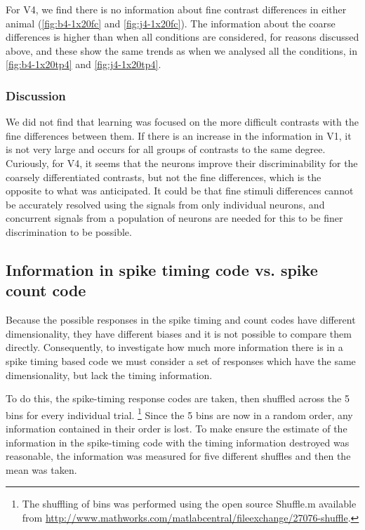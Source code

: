 For \ac{V4}, we find there is no information about fine contrast differences in either animal (\autoref{fig:b4-1x20fc} and \autoref{fig:j4-1x20fc}).
The information about the coarse differences is higher than when all conditions are considered, for reasons discussed above, and these show the same trends as when we analysed all the conditions, in \autoref{fig:b4-1x20tp4} and \autoref{fig:j4-1x20tp4}.


\subsubsection{Discussion}

We did not find that learning was focused on the more difficult contrasts with the fine differences between them.
If there is an increase in the information in \ac{V1}, it is not very large and occurs for all groups of contrasts to the same degree.
Curiously, for \ac{V4}, it seems that the neurons improve their discriminability for the coarsely differentiated contrasts, but not the fine differences, which is the opposite to what was anticipated.
It could be that fine stimuli differences cannot be accurately resolved using the signals from only individual neurons, and concurrent signals from a population of neurons are needed for this to be finer discrimination to be possible.


\subsection{Information in spike timing code vs. spike count code}

Because the possible responses in the spike timing and count codes have different dimensionality, they have different biases \citep{Panzeri2007} and it is not possible to compare them directly.
Consequently, to investigate how much more information there is in a spike timing based code we must consider a set of responses which have the same dimensionality, but lack the timing information.

To do this, the spike-timing response codes are taken, then shuffled across the 5 bins for every individual trial.%
\footnote{The shuffling of bins was performed using the open source Shuffle.m
available from \url{http://www.mathworks.com/matlabcentral/fileexchange/27076-shuffle}.}
Since the 5 bins are now in a random order, any information contained in their order is lost.
To make ensure the estimate of the information in the spike-timing code with the timing information destroyed was reasonable, the information was measured for five different shuffles%
 and then the mean was taken.


